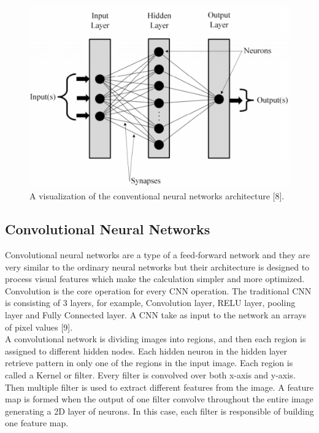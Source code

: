 \begin{figure}[ht]
\centering
\includegraphics{Figures/ca}
\decoRule
\caption[A visualization of the conventional neural networks architecture "8"]{A visualization of the conventional neural networks architecture [8].}
\label{fig:la}
\end{figure}
\subsection{Convolutional Neural Networks}
\hspace{5mm} Convolutional neural networks are a type of a feed-forward network and they are very similar to the ordinary neural networks but their architecture is designed to process visual features which make the calculation simpler and more optimized. Convolution is the core operation for every CNN operation. The traditional CNN is consisting of 3 layers, for example, Convolution layer, RELU layer, pooling layer and Fully Connected layer. A CNN take as input to the network an arrays of pixel values [9].\\

A convolutional network is dividing images into regions, and then each region is assigned to different hidden nodes. Each hidden neuron in the hidden layer retrieve pattern in only one of the regions in the input image. Each region is called a Kernel or filter. Every filter is convolved over both x-axis and y-axis. Then multiple filter is used to extract different features from the image. A feature map is formed when the output of one filter convolve throughout the entire image generating a 2D layer of neurons. In this case, each filter is responsible of building one feature map.\\

